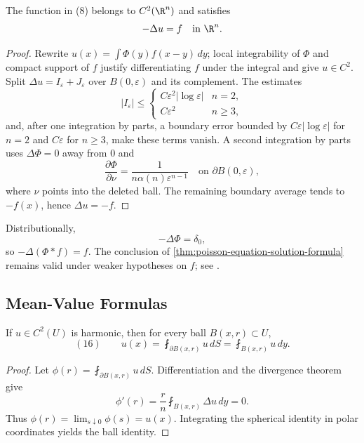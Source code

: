 \begin{theorem}
\label{thm:poisson-equation-solution-formula}
The function in (8) belongs to $C^2(\R^n)$ and satisfies
$$-\Delta u=f\quad\text{in }\R^n.$$
\end{theorem}
\begin{proof}
\sketch Rewrite $u(x)=\int\Phi(y)f(x-y)\,dy$; local integrability of $\Phi$
and compact support of $f$ justify differentiating $f$ under the integral and
give $u\in C^2$. Split $\Delta u=I_\varepsilon+J_\varepsilon$ over
$B(0,\varepsilon)$ and its complement. The estimates
$$|I_\varepsilon|\le
\begin{cases}C\varepsilon^2|\log\varepsilon|&n=2,\\
C\varepsilon^2&n\ge3,
\end{cases}$$
and, after one integration by parts, a boundary error bounded by
$C\varepsilon|\log\varepsilon|$ for $n=2$ and $C\varepsilon$ for $n\ge3$,
make these terms vanish. A second integration by parts uses
$\Delta\Phi=0$ away from $0$ and
$$\frac{\partial\Phi}{\partial\nu}
=\frac{1}{n\alpha(n)\varepsilon^{n-1}}
\quad\text{on }\partial B(0,\varepsilon),$$
where $\nu$ points into the deleted ball. The remaining boundary average tends
to $-f(x)$, hence $\Delta u=-f$.
\end{proof}

\begin{remark}
\label{rem:poisson-equation-dirac-delta-notation}
Distributionally,
$$-\Delta\Phi=\delta_0,$$
so $-\Delta(\Phi*f)=f$. The conclusion of
\cref{thm:poisson-equation-solution-formula} remains valid under weaker
hypotheses on $f$; see \cite{GilbargTrudinger1983}.
\end{remark}

\subsection{Mean-Value Formulas}
\label{sec:laplace-mean-value-formulas}

\begin{theorem}
\label{thm:mean-value-formulas-laplace}
\leanok
{}
If $u\in C^2(U)$ is harmonic, then for every ball $B(x,r)\subset U$,
$$(16)\qquad
u(x)=\fint_{\partial B(x,r)}u\,dS
=\fint_{B(x,r)}u\,dy.$$
\end{theorem}
\begin{proof}
\leanok
\sketch Let $\phi(r)=\fint_{\partial B(x,r)}u\,dS$. Differentiation and the
divergence theorem give
$$\phi'(r)=\frac{r}{n}\fint_{B(x,r)}\Delta u\,dy=0.$$
Thus $\phi(r)=\lim_{s\downarrow0}\phi(s)=u(x)$. Integrating the spherical
identity in polar coordinates yields the ball identity.
\end{proof}

